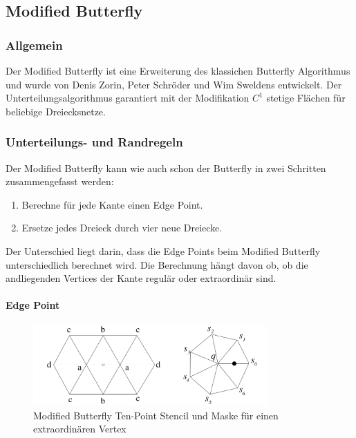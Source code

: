 \subsection{Modified Butterfly} \label{subsec:modbutterfly}

\subsubsection*{Allgemein}

Der Modified Butterfly ist eine Erweiterung des klassichen
Butterfly Algorithmus und wurde von Denis Zorin, Peter Schröder und Wim Sweldens entwickelt.
Der Unterteilungsalgorithmus garantiert mit der Modifikation \(C^1\) stetige Flächen
für beliebige Dreiecksnetze.
\cite[S. 72ff]{Zorin.subdivcourse}
\cite{Gamasutra}
\cite{Sharp}

\subsubsection*{Unterteilungs- und Randregeln}

Der Modified Butterfly kann wie auch schon der Butterfly in zwei Schritten zusammengefasst werden:
\begin{enumerate}
\item Berechne für jede Kante einen Edge Point.
\item Ersetze jedes Dreieck durch vier neue Dreiecke.
\end{enumerate}
Der Unterschied liegt darin, dass die Edge Points beim Modified Butterfly
unterschiedlich berechnet wird. Die Berechnung hängt davon ob,
ob die andliegenden Vertices der Kante regulär oder extraordinär sind.

\paragraph*{Edge Point}

\begin{figure}
\centering
\includegraphics[width=0.8\textwidth]{content/media/sd_modbutterfly_mask.jpg}
\caption{Modified Butterfly Ten-Point Stencil und Maske für einen extraordinären Vertex
\cite{Zorin:1996:ISM:237170.237254}}
\label{fig:sd_modbutterfly_mask}
\end{figure}

